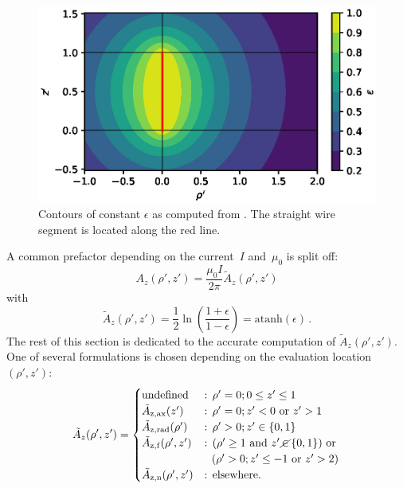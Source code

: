 \begin{figure}[htbp]
 \centering
 \includegraphics{img/epsilon_contours.eps}
 \caption{Contours of constant $\epsilon$ as computed from .
          The straight wire segment is located along the red line.}
 \label{fig:epsilon_contours}
\end{figure}
A common prefactor depending on the current~$I$ and~$\mu_0$ is split off:
\begin{equation}
  A_z(\rho', z') = \frac{\mu_0 I}{2 \pi} \tilde{A}_z (\rho', z')
\end{equation}
with
\begin{equation}
  \tilde{A}_z (\rho', z')
  = \frac{1}{2} \ln \left( \frac{1 + \epsilon}{1 - \epsilon} \right)
  = \textrm{atanh} (\epsilon) \, . \label{eqn:A_z_tilde}
\end{equation}
The rest of this section is dedicated to the accurate computation of $\tilde{A}_z (\rho', z')$.
One of several formulations is chosen depending on the evaluation location~$(\rho', z')$:
\begin{equation}
  \tilde{A}_z (\rho', z') =
  \begin{cases}
    \textrm{undefined}                   &:\, \rho' = 0; 0 \leq z' \leq 1 \\
    \tilde{A}_\mathrm{z,ax}  (z')        &:\, \rho' = 0; z' < 0 \textrm{ or } z' > 1  \\
    \tilde{A}_\mathrm{z,rad} (\rho')     &:\, \rho' > 0; z' \in \{0, 1\} \\
    \tilde{A}_\mathrm{z,f}   (\rho', z') &:\, (\rho' \geq 1 \textrm{ and } z' \,\cancel{\in}\, \{0, 1\}) \textrm{ or } \\
                ~                        &~\,\, (\rho' > 0; z' \leq -1 \textrm{ or } z' > 2) \\
    \tilde{A}_\mathrm{z,n}   (\rho', z') &:\, \textrm{elsewhere.}
  \end{cases} \label{eqn:sws_A_z_switchover}
\end{equation}
